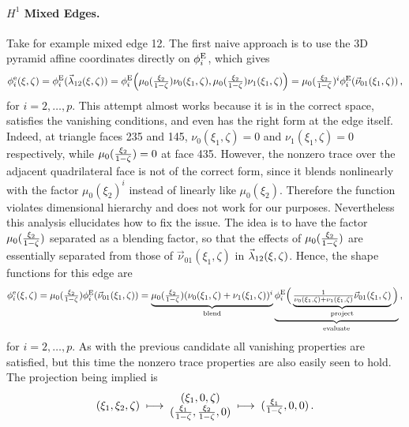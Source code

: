 \paragraph{\texorpdfstring{$H^1$}{H1} Mixed Edges.} 
Take for example mixed edge 12.
The first naive approach is to use the 3D pyramid affine coordinates directly on $\phi_i^{\mathrm{E}}$, which gives
\begin{equation*}
	\phi_i^\mathrm{e}(\xi,\zeta)=\phi_i^{\mathrm{E}}(\vec{\lambda}_{12}(\xi,\zeta))
		=\phi_i^{\mathrm{E}}\Big(\mu_0(\textstyle{\frac{\xi_2}{1-\zeta}})\nu_0(\xi_1,\zeta),\mu_0(\textstyle{\frac{\xi_2}{1-\zeta}})\nu_1(\xi_1,\zeta)\Big)
			=\mu_0(\textstyle{\frac{\xi_2}{1-\zeta}})^i\phi_i^{\mathrm{E}}(\vec{\nu}_{01}(\xi_1,\zeta))\,,
\end{equation*}
for $i=2,\ldots,p$.
This attempt almost works because it is in the correct space, satisfies the vanishing conditions, and even has the right form at the edge itself.
Indeed, at triangle faces 235 and 145, $\nu_0(\xi_1,\zeta)=0$ and $\nu_1(\xi_1,\zeta)=0$ respectively, while $\mu_0(\textstyle{\frac{\xi_2}{1-\zeta}})=0$ at face 435.
However, the nonzero trace over the adjacent quadrilateral face is not of the correct form, since it blends nonlinearly with the factor $\mu_0(\xi_2)^i$ instead of linearly like $\mu_0(\xi_2)$.
Therefore the function violates dimensional hierarchy and does not work for our purposes.
Nevertheless this analysis ellucidates how to fix the issue.
The idea is to have the factor $\mu_0(\textstyle{\frac{\xi_2}{1-\zeta}})$ separated as a blending factor, so that the effects of $\mu_0(\textstyle{\frac{\xi_2}{1-\zeta}})$ are essentially separated from those of $\vec{\nu}_{01}(\xi_1,\zeta)$ in $\vec{\lambda}_{12}(\xi,\zeta)$.
Hence, the shape functions for this edge are
\begin{equation*}
	\phi_i^\mathrm{e}(\xi,\zeta)=\mu_0(\textstyle{\frac{\xi_2}{1-\zeta}})\phi_i^{\mathrm{E}}(\vec{\nu}_{01}(\xi_1,\zeta))=
		\underbrace{\mu_0(\textstyle{\frac{\xi_2}{1-\zeta}})(\nu_0(\xi_1,\zeta)+\nu_1(\xi_1,\zeta))^i}_{\text{blend}}
    	\underbrace{\phi_i^{\mathrm{E}}\Big(\underbrace{\textstyle{\frac{1}{\nu_0(\xi_1,\zeta)+\nu_1(\xi_1,\zeta)}}
    		\vec{\nu}_{01}(\xi_1,\zeta)}_{\text{project}}\Big)}_{\text{evaluate}}\,,
\end{equation*}
for $i=2,\ldots,p$.
As with the previous candidate all vanishing properties are satisfied, but this time the nonzero trace properties are also easily seen to hold.
The projection being implied is
\begin{equation*}
	(\xi_1,\xi_2,\zeta)\;\longmapsto\;\begin{matrix}(\xi_1,0,\zeta)\\(\textstyle{\frac{\xi_1}{1-\zeta}},\textstyle{\frac{\xi_2}{1-\zeta}},0)\end{matrix}
		\;\longmapsto\;(\textstyle{\frac{\xi_1}{1-\zeta}},0,0)\,.
\end{equation*}
